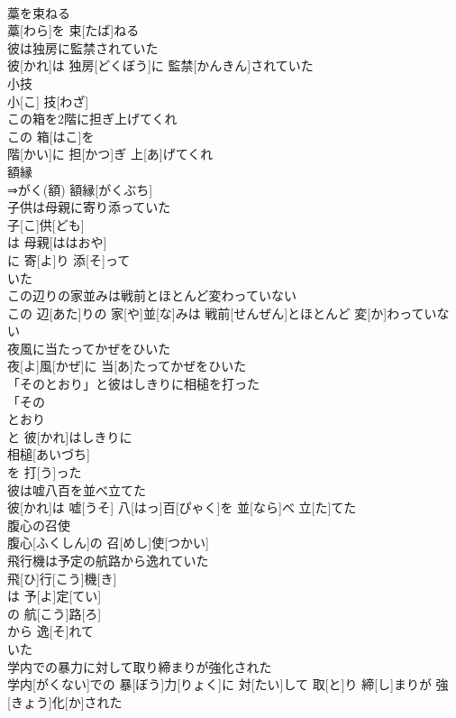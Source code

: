 \documentclass[8pt]{extreport}
\begin{document}
\begin{CJK}{UTF8}{min}
\\	藁を束ねる	
\\	藁[わら]を 束[たば]ねる
\\	彼は独房に監禁されていた	
\\	彼[かれ]は 独房[どくぼう]に 監禁[かんきん]されていた
\\	小技	
\\	小[こ] 技[わざ]
\\	この箱を2階に担ぎ上げてくれ	
\\	この 箱[はこ]を 
\\	階[かい]に 担[かつ]ぎ 上[あ]げてくれ
\\	額縁	
\\	⇒がく(額)	額縁[がくぶち]
\\	子供は母親に寄り添っていた	
\\	子[こ]供[ども]
\\	は 母親[ははおや]
\\	に 寄[よ]り 添[そ]って 
\\	いた
\\	この辺りの家並みは戦前とほとんど変わっていない	
\\	この 辺[あた]りの 家[や]並[な]みは 戦前[せんぜん]とほとんど 変[か]わっていない
\\	夜風に当たってかぜをひいた	
\\	夜[よ]風[かぜ]に 当[あ]たってかぜをひいた
\\	「そのとおり」と彼はしきりに相槌を打った	
\\	「その 
\\	とおり 
\\	と 彼[かれ]はしきりに 
\\	相槌[あいづち] 
\\	を 打[う]った 
\\	彼は嘘八百を並べ立てた	
\\	彼[かれ]は 嘘[うそ] 八[はっ]百[ぴゃく]を 並[なら]べ 立[た]てた
\\	腹心の召使	
\\	腹心[ふくしん]の 召[めし]使[つかい]
\\	飛行機は予定の航路から逸れていた	
\\	飛[ひ]行[こう]機[き]
\\	は 予[よ]定[てい]
\\	の 航[こう]路[ろ]
\\	から 逸[そ]れて 
\\	いた 
\\	学内での暴力に対して取り締まりが強化された	
\\	学内[がくない]での 暴[ぼう]力[りょく]に 対[たい]して 取[と]り 締[し]まりが 強[きょう]化[か]された

\end{CJK}
\end{document}
